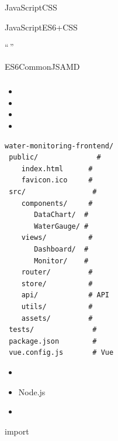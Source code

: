 \important{}JavaScriptCSS

\important{}JavaScriptES6+CSS

\important{}

\important{}``\,''

\important{}

\important{}

\important{}ES6CommonJSAMD

\important{}

\important{}

\hypertarget{section-34}{%
\subsubsection{}\label{section-34}}


\begin{itemize}
\item
  \important{}
\item
  \important{}
\item
  \important{}
\item
  \important{}
\end{itemize}

\begin{lstlisting}
water-monitoring-frontend/
 public/              # 
    index.html      # 
    favicon.ico     # 
 src/                # 
    components/     # 
       DataChart/  # 
       WaterGauge/ # 
    views/          # 
       Dashboard/  # 
       Monitor/    # 
    router/         # 
    store/          # 
    api/            # API
    utils/          # 
    assets/         # 
 tests/              # 
 package.json        # 
 vue.config.js       # Vue
\end{lstlisting}


\begin{itemize}
\item
\item
  Node.js
\item
\end{itemize}

\important{}

\important{}import \important{} \important{}

